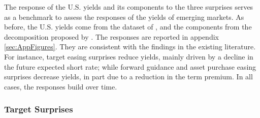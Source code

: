 {The response of the U.S. yields and its components to the three surprises serves as a benchmark to assess the responses of the yields of emerging markets. 
As before, the U.S. yields come from the dataset of \cite{GSW:2007}, and the components from the decomposition proposed by \cite{KimWright:2005}.
The responses are reported in appendix \ref{sec:AppFigures}. 
They are consistent with the findings in the existing literature.
For instance, target easing surprises reduce yields, mainly driven by a decline in the future expected short rate;
while forward guidance and asset purchase easing surprises decrease yields, in part due to a reduction in the term premium.
In all cases, the responses build over time.


\subsubsection{Target Surprises}
\iftoggle{toclinks}{\gototoc}{} %

}
